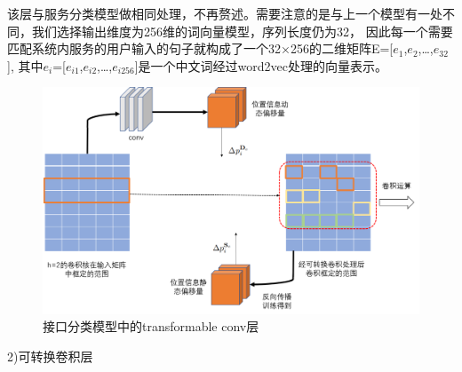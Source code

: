 该层与服务分类模型做相同处理，不再赘述。需要注意的是与上一个模型有一处不同，我们选择输出维度为256维的词向量模型，序列长度仍为32，
因此每一个需要匹配系统内服务的用户输入的句子就构成了一个32×256的二维矩阵E=[$e_{1}$,$e_{2}$,\dots,$e_{32}$],
其中$e_{i}$=[$e_{i1}$,$e_{i2}$,\dots,$e_{i256}$]是一个中文词经过word2vec处理的向量表示。

\begin{figure}[htbp]
  \centering
  \includegraphics[scale=0.4]{./images/tansconv.jpg}
  \caption{接口分类模型中的transformable conv层}
  \label{fig:tansconv}
\end{figure}

2)可转换卷积层

